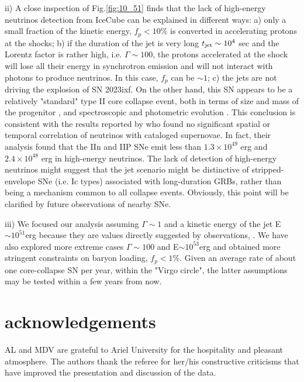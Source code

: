 \documentclass[twocolumn]{aastex631}
\begin{document}
ii) A close inspection of Fig.\ref{fig:10_51} finds that the lack of high-energy neutrinos detection from IceCube \citep{IceCubeSN2023} can be explained in different ways:
a) only a small fraction of the kinetic energy, $f_p<10\%$ is converted in accelerating protons at the shocks;
b) if the duration of the jet is very long $t_{\rm jet}\sim 10^{4}$ sec and the Lorentz factor is rather high, i.e. $\Gamma\sim 100$, the protons accelerated at the shock will lose all their energy in synchrotron emission and will not interact with photons to produce neutrinos. In this case, $f_p$ can be $\sim 1$; c) the jets are not driving the explosion of SN 2023ixf. On the other hand, this SN appears to be a relatively "standard" type II core collapse event, both in terms of size and mass of the progenitor \citep{Kilpatrick2023}, and spectroscopic \citep{Yamanaka2023} and photometric evolution \citep{Hosseinzadeh2023}. 
This conclusion is consistent with the results reported by \cite{icecube_2023} who found no significant spatial or temporal correlation of neutrinos with cataloged supernovae. In fact, their analysis found that the IIn and IIP SNe emit less than $1.3 \times 10^{49}$ erg and $2.4 \times 10^{48}$ erg in high-energy neutrinos.
The lack of detection of high-energy neutrinos might suggest that the jet scenario might be distinctive of stripped-envelope SNe (i.e. Ic types) associated with long-duration GRBs, rather than being a mechanism common to all collapse events.
Obviously, this point will be clarified by future observations of nearby SNe.

iii) We focused our analysis assuming $\Gamma \sim 1$ and a kinetic energy of the jet E$\sim 10^{51}$erg because they are values  directly suggested by observations, \citep{Izzo2019,Filippenko1997}. We have also explored more extreme cases $\Gamma\sim 100$ and E$\sim 10^{53}$erg and obtained more stringent constraints on baryon loading, $f_p < 1\%$. Given an average rate of about one core-collapse SN per year, within the "Virgo circle", the latter assumptions may be tested within a few years from now.
\bigskip
\bigskip

\section*{acknowledgements}
AL and MDV are grateful to Ariel University for the hospitality and pleasant atmosphere. The authors thank the referee for her/his constructive criticisms that
have improved the presentation and discussion of the data.

\clearpage



\end{document}
